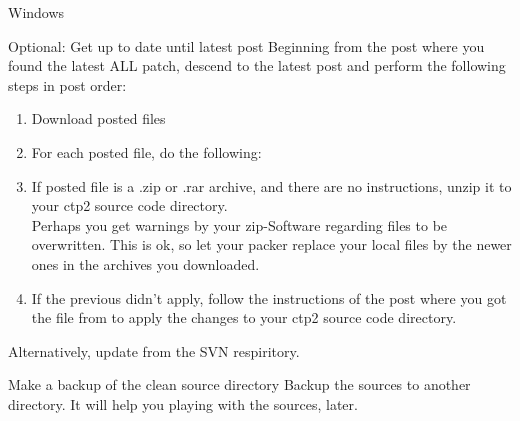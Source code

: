 \begin{section}{Windows}
\begin{subsection}{Optional: Get up to date until latest post}
Beginning from the post where you found the latest ALL patch, descend to the latest post and perform the following steps in post order:

\begin{enumerate}
\item{Download posted files}
\item{For each posted file, do the following:}
\item{If posted file is a .zip or .rar archive, and there are no instructions,
unzip it to your ctp2 source code directory.\\
Perhaps you get warnings by your zip-Software regarding files to be overwritten. This is ok, so let your packer replace your local files by the newer ones in the archives you downloaded.}
\item{If the previous didn't apply, follow the instructions of the post where you got the file from to apply the changes to your ctp2 source code directory.}
\end{enumerate}
\end{subsection}%

Alternatively, update from the SVN respiritory.

\begin{subsection}{Make a backup of the clean source directory}
Backup the sources to another directory. It will help you playing with the sources, later.
\end{subsection}%

\end{section}%
